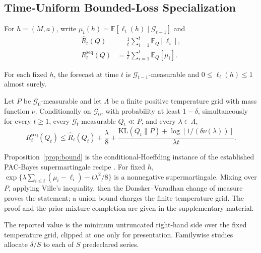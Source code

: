 \subsection{Time-Uniform Bounded-Loss Specialization}
For $h=(M,a)$, write $\mu_t(h)=\mathbb E[\ell_t(h)\mid\mathcal G_{t-1}]$ and
\begin{align}
\widehat R_t(Q)&=\frac1t\sum_{i=1}^{t}\mathbb E_Q[\ell_i],\\
R_t^{\mathrm{seq}}(Q)&=\frac1t\sum_{i=1}^{t}\mathbb E_Q[\mu_i].
\label{eq:risks}
\end{align}

\begin{assumption}
For each fixed $h$, the forecast at time $t$ is $\mathcal G_{t-1}$-measurable and $0\le\ell_t(h)\le1$ almost surely.
\end{assumption}

\begin{proposition}
\label{prop:bound}
Let $P$ be $\mathcal G_0$-measurable and let $\Lambda$ be a finite positive temperature grid with mass function $\nu$. Conditionally on $\mathcal G_0$, with probability at least $1-\delta$, simultaneously for every $t\ge1$, every $\mathcal G_t$-measurable $Q_t\ll P$, and every $\lambda\in\Lambda$,
\begin{equation}
R_t^{\mathrm{seq}}(Q_t)\le \widehat R_t(Q_t)+\frac{\lambda}{8}+
\frac{\mathrm{KL}(Q_t\|P)+\log[1/(\delta\nu(\lambda))]}{\lambda t}.
\label{eq:main_bound}
\end{equation}
\end{proposition}

Proposition~\ref{prop:bound} is the conditional-Hoeffding instance of the established PAC-Bayes supermartingale recipe \cite{seldin2012martingales,chugg2023unified}. For fixed $h$, $\exp\{\lambda\sum_{i\le t}(\mu_i-\ell_i)-t\lambda^2/8\}$ is a nonnegative supermartingale. Mixing over $P$, applying Ville's inequality, then the Donsker--Varadhan change of measure proves the statement; a union bound charges the finite temperature grid. The proof and the prior-mixture completion are given in the supplementary material.

The reported value is the minimum untruncated right-hand side over the fixed temperature grid, clipped at one only for presentation. Familywise studies allocate $\delta/S$ to each of $S$ predeclared series.

